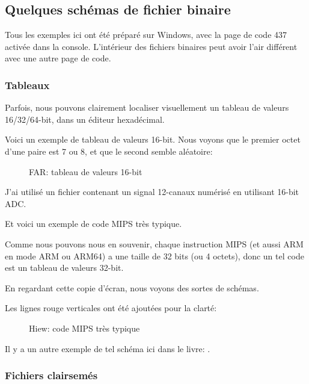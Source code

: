 
\subsection{Quelques schémas de fichier binaire}

Tous les exemples ici ont été préparé sur Windows, avec la page de code 437 activée%
dans la console.
L'intérieur des fichiers binaires peut avoir l'air différent avec une autre page
de code.

\clearpage
\subsubsection{Tableaux}

Parfois, nous pouvons clairement localiser visuellement un tableau de valeurs 16/32/64-bit,
dans un éditeur hexadécimal.

Voici un exemple de tableau de valeurs 16-bit.
Nous voyons que le premier octet d'une paire est 7 ou 8, et que le second semble
aléatoire:

\begin{figure}[H]
\centering
{}
\caption{FAR: tableau de valeurs 16-bit}
\end{figure}

J'ai utilisé un fichier contenant un signal 12-canaux numérisé en utilisant 16-bit \ac{ADC}.

\clearpage
{}
\par Et voici un exemple de code MIPS très typique.

Comme nous pouvons nous en souvenir, chaque instruction MIPS (et aussi ARM en mode
ARM ou ARM64) a une taille de 32 bits (ou 4 octets), donc un tel code est un tableau
de valeurs 32-bit.

En regardant cette copie d'écran, nous voyons des sortes de schémas.

Les lignes rouge verticales ont été ajoutées pour la clarté:

\begin{figure}[H]
\centering
{}
\caption{Hiew: code MIPS très typique}
\end{figure}

Il y a un autre exemple de tel schéma ici dans le livre:
.

\clearpage
\subsubsection{Fichiers clairsemés}

